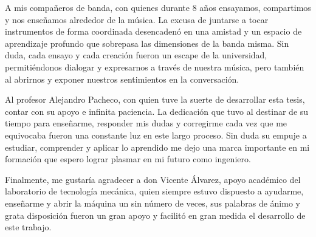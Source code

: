 A mis compañeros de banda, con quienes durante 8 años ensayamos, compartimos y nos enseñamos alrededor de la música. La excusa de juntarse a tocar instrumentos de forma coordinada desencadenó en una amistad y un espacio de aprendizaje profundo que sobrepasa las dimensiones de la banda misma. Sin duda, cada ensayo y cada creación fueron un escape de la universidad, permitiéndonos dialogar y expresarnos a través de nuestra música, pero también al abrirnos y exponer nuestros sentimientos en la conversación.

Al profesor Alejandro Pacheco, con quien tuve la suerte de desarrollar esta tesis, contar con su apoyo e infinita paciencia. La dedicación que tuvo al destinar de su tiempo para enseñarme, responder mis dudas y corregirme cada vez que me equivocaba fueron una constante luz en este largo proceso.  Sin duda su empuje a estudiar, comprender y aplicar lo aprendido me dejo una marca importante en mi formación que espero lograr plasmar en mi futuro como ingeniero. 

Finalmente, me gustaría agradecer a don Vicente Álvarez, apoyo académico del laboratorio de tecnología mecánica, quien siempre estuvo dispuesto a ayudarme, enseñarme y abrir la máquina un sin número de veces, sus palabras de ánimo y grata disposición fueron un gran apoyo y facilitó en gran medida el desarrollo de este trabajo.


